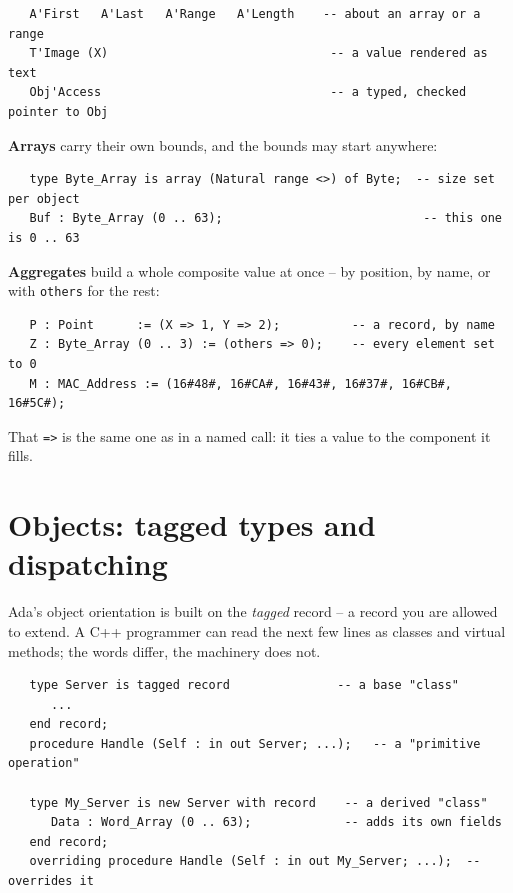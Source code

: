 \begin{lstlisting}
   A'First   A'Last   A'Range   A'Length    -- about an array or a range
   T'Image (X)                               -- a value rendered as text
   Obj'Access                                -- a typed, checked pointer to Obj
\end{lstlisting}

\textbf{Arrays} carry their own bounds, and the bounds may start anywhere:

\begin{lstlisting}
   type Byte_Array is array (Natural range <>) of Byte;  -- size set per object
   Buf : Byte_Array (0 .. 63);                            -- this one is 0 .. 63
\end{lstlisting}

\textbf{Aggregates} build a whole composite value at once -- by position, by name,
or with \texttt{others} for the rest:

\begin{lstlisting}
   P : Point      := (X => 1, Y => 2);          -- a record, by name
   Z : Byte_Array (0 .. 3) := (others => 0);    -- every element set to 0
   M : MAC_Address := (16#48#, 16#CA#, 16#43#, 16#37#, 16#CB#, 16#5C#);
\end{lstlisting}

That \texttt{=>} is the same one as in a named call: it ties a value to the
component it fills.

\section{Objects: tagged types and dispatching}

Ada's object orientation is built on the \emph{tagged} record -- a record you are
allowed to extend. A C++ programmer can read the next few lines as classes and
virtual methods; the words differ, the machinery does not.

\begin{lstlisting}
   type Server is tagged record               -- a base "class"
      ...
   end record;
   procedure Handle (Self : in out Server; ...);   -- a "primitive operation"

   type My_Server is new Server with record    -- a derived "class"
      Data : Word_Array (0 .. 63);             -- adds its own fields
   end record;
   overriding procedure Handle (Self : in out My_Server; ...);  -- overrides it
\end{lstlisting}

